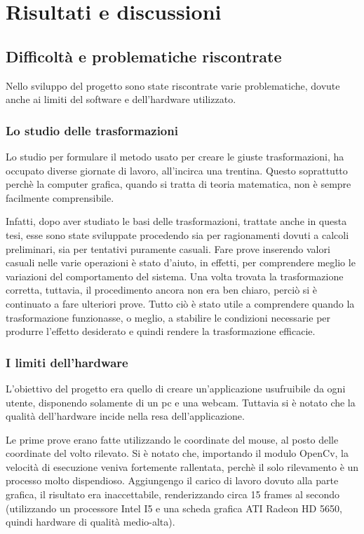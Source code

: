 
\chapter{Risultati e discussioni}

\section{Difficoltà e problematiche riscontrate}

Nello sviluppo del progetto sono state riscontrate varie problematiche, dovute anche ai limiti del software e dell'hardware utilizzato.


\subsection{Lo studio delle trasformazioni}
Lo studio per formulare il metodo usato per creare le giuste trasformazioni, ha occupato diverse giornate di lavoro, all'incirca una trentina. Questo soprattutto perchè la computer grafica, quando si tratta di teoria matematica, non è sempre facilmente comprensibile.

Infatti, dopo aver studiato le basi delle trasformazioni, trattate anche in questa tesi, esse sono state sviluppate procedendo sia per ragionamenti dovuti a calcoli preliminari, sia per tentativi puramente casuali. Fare prove inserendo valori casuali nelle varie operazioni è stato d'aiuto, in effetti, per comprendere meglio le variazioni del comportamento del sistema. Una volta trovata la trasformazione corretta, tuttavia, il procedimento ancora non era ben chiaro, perciò si è continuato a fare ulteriori prove. Tutto ciò è stato utile a comprendere quando la trasformazione funzionasse, o meglio, a stabilire le condizioni necessarie per produrre l'effetto desiderato e quindi rendere la trasformazione efficacie.



\subsection{I limiti dell'hardware}
L'obiettivo del progetto era quello di creare un'applicazione usufruibile da ogni utente, disponendo solamente di un pc e una webcam. Tuttavia si è notato che la qualità dell'hardware incide nella resa dell'applicazione.

Le prime prove erano fatte utilizzando le coordinate del mouse, al posto delle coordinate del volto rilevato. Si è notato che, importando il modulo OpenCv, la velocità di esecuzione veniva fortemente rallentata, perchè il solo rilevamento è un processo molto dispendioso. Aggiungengo il carico di lavoro dovuto alla parte grafica, il risultato era inaccettabile, renderizzando circa 15 frames al secondo (utilizzando un processore Intel I5 e una scheda grafica ATI Radeon HD 5650, quindi hardware di qualità medio-alta).

